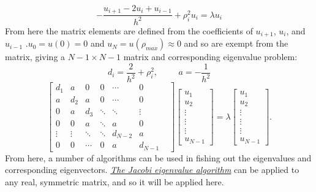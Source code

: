 \documentclass[10pt,a4paper]{article}
\begin{document}
\begin{equation*}
-\frac{u_{i+1} -2u_i +u_{i-1}}{h^2}+\rho_i^2u_i= \lambda u_i
\end{equation*}
From here the matrix elements are defined from the coefficients of $u_{i+1}$, $u_{i}$, and $u_{i-1}$ .$u_0 = u(0)= 0$ and $u_N = u(\rho_{max}) \approx 0$ and so are exempt from the matrix, giving a $N-1 \times N-1$ matrix and corresponding eigenvalue problem:
$$
d_i=\frac{2}{h^2}+\rho_i^2,\hspace{1cm}  a=-\frac{1}{h^2}
$$
\begin{equation}
\label{discrete matrix}
\begin{bmatrix}
d_1 & a &0  &0  &\cdots  & 0\\ 
 a&  d_2& a & 0 & \cdots &0 \\ 
 0&  a&  d_3& \ddots  &\ddots  &\vdots \\ 
 0& 0 & a &  \ddots& a &0 \\ 
 \vdots&\vdots  &\ddots  &\ddots  &  d_{N-2}&a \\ 
 0& 0 & \cdots & 0 & a &d_{N-1}& 
\end{bmatrix}
  \begin{bmatrix} u_{1} \\
                                                              u_{2} \\
                                                              \vdots\\ \vdots\\ \vdots\\
                                                              u_{N-1}
             \end{bmatrix}=\lambda \begin{bmatrix} u_{1} \\
                                                              u_{2} \\
                                                              \vdots\\ \vdots\\ \vdots\\
                                                              u_{N-1}
             \end{bmatrix}.  
\end{equation}
From here, a number of algorithms can be used in fishing out the eigenvalues and corresponding eigenvectors. \hyperref[jacobi algo]{\emph{The Jacobi eigenvalue algorithm}} can be applied to any real, symmetric matrix, and so it will be applied here.
\end{document}
